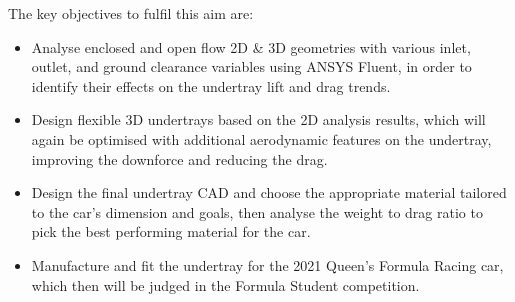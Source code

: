 \noindent
The key objectives to fulfil this aim are:
\begin{itemize}

    \item Analyse enclosed and open flow 2D \& 3D geometries with various inlet, outlet, and ground clearance variables using ANSYS Fluent, in order to identify their effects on the undertray lift and drag trends. 
    
    \item Design flexible 3D undertrays based on the 2D analysis results, which will again be optimised with additional aerodynamic features on the undertray, improving the downforce and reducing the drag.
    
	\item Design the final undertray CAD and choose the appropriate material tailored to the car’s dimension and goals, then analyse the weight to drag ratio to pick the best performing material for the car.
	
    \item Manufacture and fit the undertray for the 2021 Queen’s Formula Racing car, which then will be judged in the Formula Student competition.
\end{itemize}